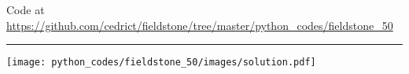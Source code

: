

\begin{center}
Code at \url{https://github.com/cedrict/fieldstone/tree/master/python_codes/fieldstone_50}
\end{center}

\par\noindent\rule{\textwidth}{0.4pt}


\texttt{[image: python\_codes/fieldstone\_50/images/solution.pdf]}

